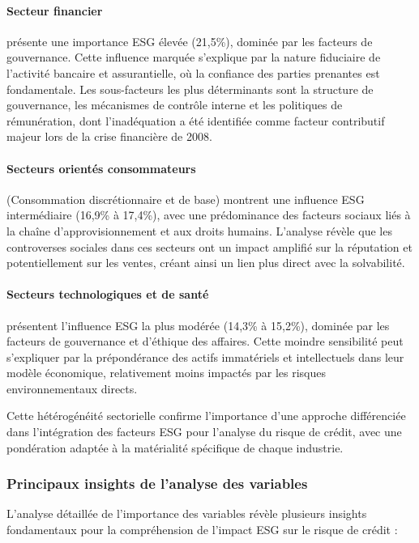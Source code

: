 \paragraph{Secteur financier} présente une importance ESG élevée (21,5\%), dominée par les facteurs de gouvernance. Cette influence marquée s'explique par la nature fiduciaire de l'activité bancaire et assurantielle, où la confiance des parties prenantes est fondamentale. Les sous-facteurs les plus déterminants sont la structure de gouvernance, les mécanismes de contrôle interne et les politiques de rémunération, dont l'inadéquation a été identifiée comme facteur contributif majeur lors de la crise financière de 2008.

\paragraph{Secteurs orientés consommateurs} (Consommation discrétionnaire et de base) montrent une influence ESG intermédiaire (16,9\% à 17,4\%), avec une prédominance des facteurs sociaux liés à la chaîne d'approvisionnement et aux droits humains. L'analyse révèle que les controverses sociales dans ces secteurs ont un impact amplifié sur la réputation et potentiellement sur les ventes, créant ainsi un lien plus direct avec la solvabilité.

\paragraph{Secteurs technologiques et de santé} présentent l'influence ESG la plus modérée (14,3\% à 15,2\%), dominée par les facteurs de gouvernance et d'éthique des affaires. Cette moindre sensibilité peut s'expliquer par la prépondérance des actifs immatériels et intellectuels dans leur modèle économique, relativement moins impactés par les risques environnementaux directs.

Cette hétérogénéité sectorielle confirme l'importance d'une approche différenciée dans l'intégration des facteurs ESG pour l'analyse du risque de crédit, avec une pondération adaptée à la matérialité spécifique de chaque industrie.

\subsubsection{Principaux insights de l'analyse des variables}

L'analyse détaillée de l'importance des variables révèle plusieurs insights fondamentaux pour la compréhension de l'impact ESG sur le risque de crédit :

